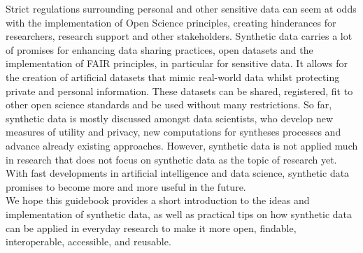 
\label{conclusion}

Strict regulations surrounding personal and other sensitive data can seem at odds with the implementation of Open Science principles, creating hinderances for researchers, research support and other stakeholders. Synthetic data carries a lot of promises for enhancing data sharing practices, open datasets and the implementation of FAIR principles, in particular for sensitive data. It allows for the creation of artificial datasets that mimic real-world data whilst protecting private and personal information. These datasets can be shared, registered, fit to other open science standards and be used without many restrictions. So far, synthetic data is mostly discussed amongst data scientists, who develop new measures of utility and privacy, new computations for syntheses processes and advance already existing approaches. However, synthetic data is not applied much in research that does not focus on synthetic data as the topic of research yet. With fast developments in artificial intelligence and data science, synthetic data promises to become more and more useful in the future.  \\

We hope this guidebook provides a short introduction to the ideas and implementation of synthetic data, as well as practical tips on how synthetic data can be applied in everyday research to make it more open, findable, interoperable, accessible, and reusable.  


